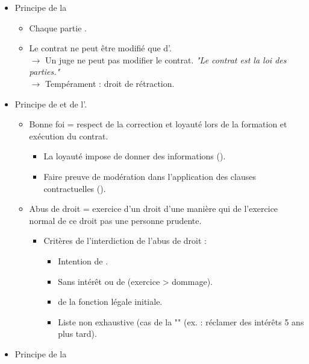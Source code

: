 \begin{itemize}
\begin{itemize}
	\end{itemize}
	\item Principe de la 
	\begin{itemize}
		\item Chaque partie .
		\item Le contrat ne peut être modifié que d'.\\
		$\rightarrow$ Un juge ne peut pas modifier le contrat. \textit{"Le contrat est la loi des parties."}\\
		$\rightarrow$ Tempérament : droit de rétraction.
	\end{itemize}
	\bigskip\medskip
	\item Principe de  et de l'.
	\begin{itemize}
		\item Bonne foi = respect de la correction et loyauté lors de la formation et exécution du contrat.
		\begin{itemize}
			\item La loyauté impose de donner des informations ().
			\item Faire preuve de modération dans l'application des clauses contractuelles ().
		\end{itemize}
		\item Abus de droit = exercice d'un droit d'une manière qui  de l'exercice normal de ce droit pas une personne prudente.
		\begin{itemize}
			\item Critères de l'interdiction de l'abus de droit :
			\begin{itemize}
				\item Intention de .
				\item Sans intérêt ou de  (exercice > dommage).
				\item {} de la fonction légale initiale.
				\item Liste non exhaustive (cas de la "" (ex. : réclamer des intérêts 5 ans plus tard).
			\end{itemize}
		\end{itemize}
	\end{itemize}
	\item Principe de la 
	\begin{itemize}

\end{itemize}
\end{itemize}
